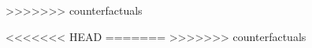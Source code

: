 \documentclass{beamer}
\begin{document}
>>>>>>> counterfactuals


%
%      
<<<<<<< HEAD
%   
=======
%
>>>>>>> counterfactuals

\end{document}
